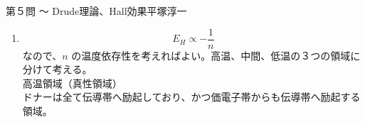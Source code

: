 \begin{answer}{第５問 〜 Drude理論、Hall効果}{平塚淳一}
\begin{enumerate}
\begin{enumerate}
\begin{align}
    \frac{1}{2}M\<a\>^2&=\frac{1}{2}\kB T\\
    \frac{1}{2}m\<v\>^2&=\frac{1}{2}\kB T
    \end{align}
    $S \propto \<a\>^2$であり、
    $\frac{1}{\tau} \propto (散乱頻度) \propto S\<v\> \propto T^{3/2}$なので
    \begin{align}
    \tau \propto T^{-3/2}
    \end{align}
    低温の場合、不純物散乱の寄与が大きい。\\
    ラザフォード散乱では
    \begin{equation}
    S \propto \<v\>^{-4}
    \end{equation}
    これを示すのはかなり面倒なので、
    力学か量子力学の何かの教科書（散乱）を見てください。
    古典でも量子でも結果は同じです。
    多分結果を記憶していたほうが良い。
    \begin{align}
    \frac{1}{2}m\<v\>^2=\frac{1}{2}\kB T
    \end{align}
    $\frac{1}{\tau} \propto \verb|(散乱頻度)| \propto S\<v\> \propto T^{-3/2}$なので
    \begin{equation}
    \tau \propto T^{3/2}
    \end{equation}
    ここではnの温度依存性は無視するようですから、
    \begin{align}
    \sigma &\propto \tau\\
    &\propto T^{-3/2} \;\; (at 高温)\\
    &\propto T^{3/2} \;\; (at 低温)
    \end{align}
  \item 
    \begin{equation}
    -e(E_y+v_xB)=0
    \end{equation}
    \begin{equation}
    v_x=v_{\infty}=-\frac{j}{ne}
    \end{equation}
    \begin{equation}
    E_H=E_y=-\frac{jB}{ne}
    \end{equation}
  \end{enumerate}
\item 
  \begin{equation}
  E_H \propto -\frac{1}{n}
  \end{equation}
  なので、$n$ の温度依存性を考えればよい。高温、中間、低温の３つの領域に分けて考える。\\
  高温領域（真性領域）\\
  ドナーは全て伝導帯へ励起しており、かつ価電子帯からも伝導帯へ励起する領域。
  \begin{equation}

\end{equation}
\end{enumerate}
\end{answer}
